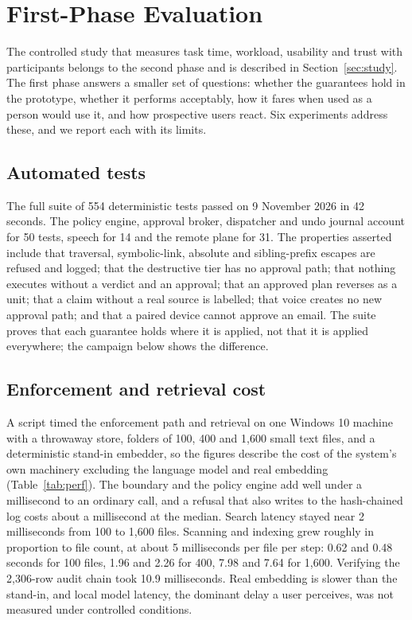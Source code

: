 \section{First-Phase Evaluation}
\label{sec:evaluation}

The controlled study that measures task time, workload, usability and trust with participants belongs to the second phase and is described in Section~\ref{sec:study}. The first phase answers a smaller set of questions: whether the guarantees hold in the prototype, whether it performs acceptably, how it fares when used as a person would use it, and how prospective users react. Six experiments address these, and we report each with its limits.

\subsection{Automated tests}
The full suite of 554 deterministic tests passed on 9 November 2026 in 42 seconds. The policy engine, approval broker, dispatcher and undo journal account for 50 tests, speech for 14 and the remote plane for 31. The properties asserted include that traversal, symbolic-link, absolute and sibling-prefix escapes are refused and logged; that the destructive tier has no approval path; that nothing executes without a verdict and an approval; that an approved plan reverses as a unit; that a claim without a real source is labelled; that voice creates no new approval path; and that a paired device cannot approve an email. The suite proves that each guarantee holds where it is applied, not that it is applied everywhere; the campaign below shows the difference.

\subsection{Enforcement and retrieval cost}
A script timed the enforcement path and retrieval on one Windows 10 machine with a throwaway store, folders of 100, 400 and 1,600 small text files, and a deterministic stand-in embedder, so the figures describe the cost of the system's own machinery excluding the language model and real embedding (Table~\ref{tab:perf}). The boundary and the policy engine add well under a millisecond to an ordinary call, and a refusal that also writes to the hash-chained log costs about a millisecond at the median. Search latency stayed near 2 milliseconds from 100 to 1,600 files. Scanning and indexing grew roughly in proportion to file count, at about 5 milliseconds per file per step: 0.62 and 0.48 seconds for 100 files, 1.96 and 2.26 for 400, 7.98 and 7.64 for 1,600. Verifying the 2,306-row audit chain took 10.9 milliseconds. Real embedding is slower than the stand-in, and local model latency, the dominant delay a user perceives, was not measured under controlled conditions.


